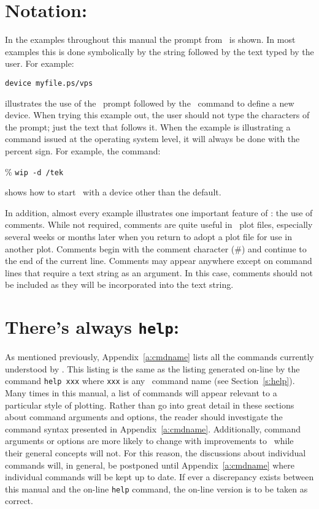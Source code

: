 \section*{Notation:}
In the examples throughout this manual the
prompt from \wip\ is shown.
In most examples this is
done symbolically by the string \wipp followed by the
text typed by the user.
For example:
\begin{wiplist}%
  \item {\tt device myfile.ps/vps}
\end{wiplist}
illustrates the use of the \wip\ prompt followed by the
\wip\ command to define a new device.
When trying this example out, the user should not type the characters of
the prompt; just the text that follows it.
When the example is illustrating a command issued at the operating
system level, it will always be done with the percent sign.
For example, the command:
\begin{wiplist}%
  \item [\%] {\tt wip -d /tek}
\end{wiplist}
shows how to start \wip\ with a device other than the default.

In addition, almost every example illustrates one important feature of \wip:
the use of comments.
While not required, comments are quite useful in \wip\ plot files,
especially several weeks or months later when you return to adopt a plot
file for use in another plot.
Comments begin with the comment character
(\#)
and continue to the end of the current line.
Comments may appear anywhere except on command lines that require a text
string as an argument.
In this case, comments should not be included as they will be
incorporated into the text string.

\section*{There's always {\tt help}:}
As mentioned previously,
Appendix~\ref{a:cmdname} lists all the commands currently understood by \wip.
This listing is the same as the listing generated on-line by the command
{\tt help xxx}%
where {\tt xxx} is any \wip\ command
name (see Section~\ref{s:help}).
Many times in this manual, a list of commands
will appear relevant to a particular style of plotting.
Rather than go into great detail in these sections
about command arguments and options,
the reader should investigate the command syntax presented
in Appendix~\ref{a:cmdname}.
Additionally, command arguments or options are more likely to change
with improvements to \wip\ while their general concepts will not.
For this reason, the discussions about individual commands will, in
general, be postponed until Appendix~\ref{a:cmdname} where individual
commands will be kept up to date.
If ever a discrepancy exists between this manual and the on-line
{\tt help} command, the on-line version is to be taken as correct.

